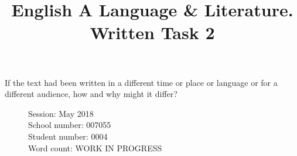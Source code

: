 \documentclass[a4paper,12pt]{article}
\title{English A Language \& Literature. Written Task 2}
\date{}
\author{}
\begin{document}
\maketitle
\begin{center}
  If the text had been written in a different time or place or language or for a different audience, how and why might it differ?
\end{center}
\begin{flushleft}
  \begin{figure}
    Session: May 2018\\
    School number: 007055\\
    Student number: 0004\\
    Word count: WORK IN PROGRESS\\
    \end{figure}
\end{flushleft}
\newpage



  
\end{document}
